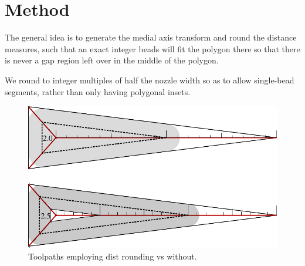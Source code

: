 \section{Method}
The general idea is to generate the medial axis transform and round the distance measures,
such that an exact integer beads will fit the polygon there
so that there is never a gap region left over in the middle of the polygon.

We round to integer multiples of half the nozzle width so as to allow single-bead segments, rather than only having polygonal insets.

\begin{figure}
\includegraphics[width=\columnwidth]{sources/method/rounded_vs_unrounded.pdf}
\caption{Toolpaths employing dist rounding vs without.}
\label{rounded_vs_unrounded}
\end{figure}


